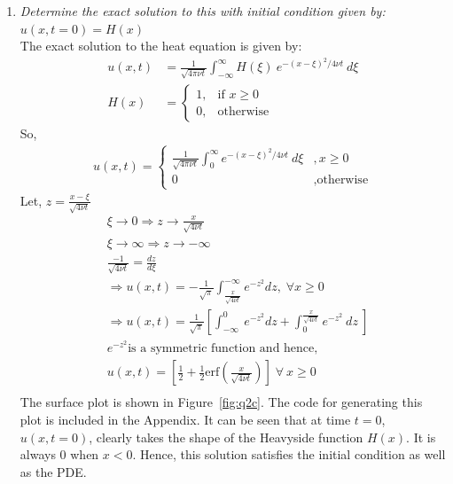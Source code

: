 \documentclass[11pt]{article}
\begin{document}
\begin{enumerate}
\begin{enumerate}[label=(\alph*)]
\item{\color{blue} \textit{Determine the exact solution to this with initial condition given by:}} $u(x,t=0) = H(x)$\\
The exact solution to the heat equation is given by: 
\begin{align*}
u(x,t) & = \frac{1}{\sqrt{4 \pi\nu t}}\int_{-\infty}^{\infty} H(\xi) \ e^{-(x-\xi)^2/4\nu t} \ d\xi \\
H(x) & = 
\begin{cases}
    1, & \text{if } x\geq 0\\
    0, & \text{otherwise}
\end{cases}
\end{align*}
So, 
\begin{align*}
u(x,t) = 
\begin{cases}
\frac{1}{\sqrt{4\pi\nu t}}\int_0^\infty e^{-(x-\xi)^2/4\nu t} \ d\xi &, x \geq 0 \\
0 &, \text{otherwise}
\end{cases}
\end{align*}
Let, $z = \frac{x-\xi}{\sqrt{4\nu t}}$
\begin{align*}
& \xi  \rightarrow 0 \Rightarrow z \rightarrow \frac{x}{\sqrt{4\nu t}} \\
& \xi  \rightarrow \infty \Rightarrow z \rightarrow -\infty \\
& \frac{-1}{\sqrt{4\nu t}}  = \frac{dz}{d\xi} \\
& \Rightarrow u(x,t) = -\frac{1}{\sqrt{\pi}}\int_\frac{x}{\sqrt{4\nu t}}^{-\infty} e^{-z^2} dz, \; \forall x\geq 0 \\
& \Rightarrow u(x,t) = \frac{1}{\sqrt{\pi}}\left[\int_{-\infty}^0 \ e^{-z^2} dz + \int_0^{\frac{x}{\sqrt{4\nu t}}} e^{-z^2} \ dz \ \right] \\
& e^{-z^2} \text{is a symmetric function and hence,} \\
& u(x,t) = \left[\frac{1}{2} + \frac{1}{2} \text{erf}\left(\frac{x}{\sqrt{4\nu t}}\right) \right] \; \forall \ x \geq 0 \\
\end{align*}
The surface plot is shown in Figure~\ref{fig:q2c}. The code for generating this plot is included in the Appendix. It can be seen that at time $t=0$, $u(x,t=0)$, clearly takes the shape of the Heavyside function $H(x)$. It is always 0 when $x<0$. Hence, this solution satisfies the initial condition as well as the PDE. 
\begin{figure}[t]
\begin{center}

\end{center}
\end{figure}
\end{enumerate}
\end{enumerate}
\end{document}
